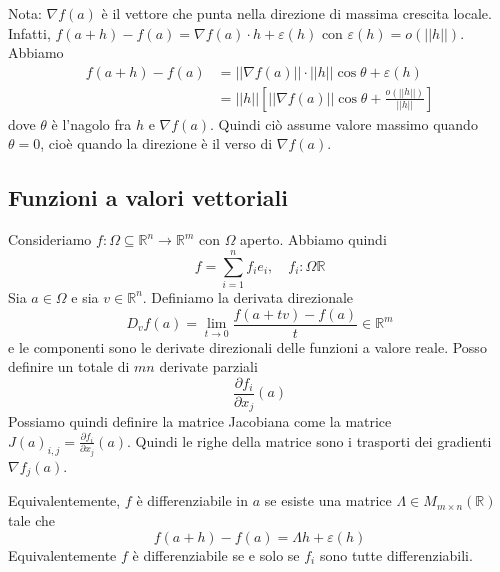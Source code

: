 \documentclass[a4paper]{article}
\begin{document}
Nota: \(\nabla f(a)\) è il vettore che punta nella direzione di massima crescita locale.
Infatti, \(f(a+h) - f(a) = \nabla f(a) \cdot h + \varepsilon(h)\)
con \(\varepsilon(h) = o(||h||)\).
Abbiamo
\begin{align*}
    f(a+h) - f(a) &= ||\nabla f(a)|| \cdot ||h|| \cos\theta + \varepsilon(h) \\
    &= ||h|| \left[
        ||\nabla f(a)|| \cos\theta + \frac{o(||h||)}{||h||}
    \right]
\end{align*}
dove \(\theta\) è l'nagolo fra \(h\) e \(\nabla f(a)\).
Quindi ciò assume valore massimo quando \(\theta = 0\),
cioè quando la direzione è il verso di \(\nabla f(a)\).

\pagebreak

\subsection{Funzioni a valori vettoriali}

Consideriamo \(f\colon \Omega \subseteq \mathbb{R}^n \to \mathbb{R}^m\) con \(\Omega\)
aperto. Abbiamo quindi
\[
    f = \sum_{i=1}^n f_i e_i, \quad f_i \colon \Omega \mathbb{R}
\]
Sia \(a\in \Omega\) e sia \(v \in \mathbb{R}^n\). Definiamo la derivata direzionale
\[
    D_v f(a) = \lim_{t\to 0} \frac{
        f(a+tv) - f(a)
    }{t} \in \mathbb{R}^m
\]
e le componenti sono le derivate direzionali delle funzioni a valore reale.
Posso definire un totale di \(mn\) derivate parziali
\[
    \frac{\partial f_i}{\partial x_j} (a)
\]
Possiamo quindi definire la matrice Jacobiana come la matrice
\(J(a)_{i,j} = \frac{\partial f_i}{\partial x_j} (a)\).
Quindi le righe della matrice sono i trasporti dei gradienti \(\nabla f_j(a)\).


Equivalentemente, \(f\) è differenziabile
in \(a\) se esiste una matrice \(\Lambda \in M_{m\times n}(\mathbb{R})\)
tale che \[ f(a+h) - f(a) = \Lambda h + \varepsilon(h) \]
Equivalentemente \(f\) è differenziabile se e solo se \(f_i\) sono tutte differenziabili.

\end{document}
